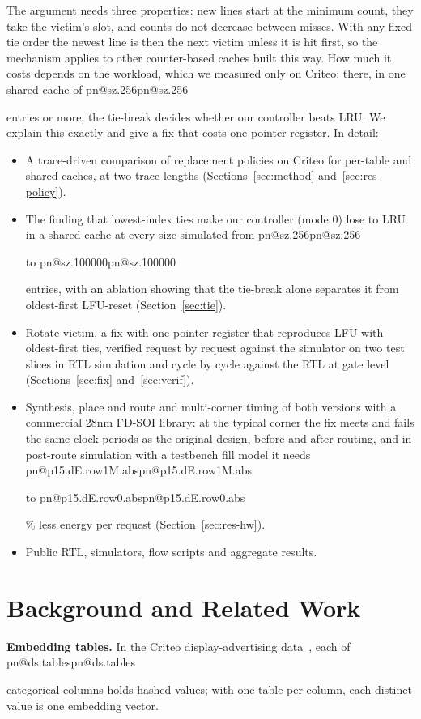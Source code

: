\documentclass[conference,10pt]{IEEEtran}
\makeatletter
\newcommand{\R}[1]{\ifcsname pn@#1\endcsname\csname pn@#1\endcsname\else
  \PackageError{paper}{number key '#1' is not defined in macros.tex}{Run tools/make_paper_macros.py}\fi}
\makeatother
\begin{document}
The argument needs three properties: new lines start at the minimum count, they take the victim's slot, and counts do
not decrease between misses. With any fixed tie order the newest line is then the next victim unless it is hit
first, so the mechanism applies to other counter-based caches built this way. How much it costs depends on the
workload, which we measured only on Criteo: there, in one shared cache of \R{sz.256} entries or more, the tie-break
decides whether our controller beats LRU. We explain this exactly and give a fix that costs one pointer register. In
detail:
\begin{itemize}
\item A trace-driven comparison of replacement policies on Criteo for per-table and shared caches, at two trace
lengths (Sections~\ref{sec:method} and~\ref{sec:res-policy}).
\item The finding that lowest-index ties make our controller (mode 0) lose to LRU in a shared cache at every size
simulated from \R{sz.256} to \R{sz.100000} entries, with an ablation showing that the tie-break alone separates it
from oldest-first LFU-reset (Section~\ref{sec:tie}).
\item Rotate-victim, a fix with one pointer register that reproduces LFU with oldest-first ties, verified request by
request against the simulator on two test slices in RTL simulation and cycle by cycle against the RTL at gate level
(Sections~\ref{sec:fix} and~\ref{sec:verif}).
\item Synthesis, place and route and multi-corner timing of both versions with a commercial 28nm FD-SOI library: at
the typical corner the fix meets and fails the same clock periods as the original design, before and after routing,
and in post-route simulation with a testbench fill model it needs \R{p15.dE.row1M.abs} to \R{p15.dE.row0.abs}\% less
energy per request (Section~\ref{sec:res-hw}).
\item Public RTL, simulators, flow scripts and aggregate results.
\end{itemize}

\section{Background and Related Work}\label{sec:bg}
\textbf{Embedding tables.} In the Criteo display-advertising data~\cite{criteo2014dac}, each of \R{ds.tables}
categorical columns holds hashed values; with one table per column, each distinct value is one embedding vector.
\end{document}
